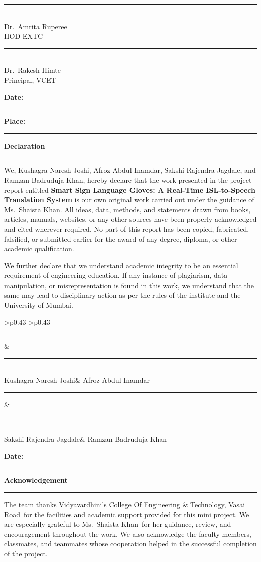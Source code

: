 \documentclass[12pt,a4paper]{report}
\newcommand{\ProjectTitle}{Smart Sign Language Gloves: A Real-Time ISL-to-Speech Translation System}
\newcommand{\CollegeName}{Vidyavardhini's College Of Engineering \& Technology, Vasai Road}
\newcommand{\SupervisorName}{Ms.\ Shaista Khan}
\newcommand{\StudentOne}{Kushagra Naresh Joshi}
\newcommand{\StudentTwo}{Afroz Abdul Inamdar}
\newcommand{\StudentThree}{Sakshi Rajendra Jagdale}
\newcommand{\StudentFour}{Ramzan Badruduja Khan}
\newcommand{\signatureblock}[2]{%
  \begin{minipage}[t]{0.42\textwidth}
    \centering
    \vspace{0.8cm}
    \rule{0.8\textwidth}{0.4pt}\\
    #1\\
    #2
  \end{minipage}
}
\newcommand{\frontmatterheading}[1]{%
  \begin{center}
    {\Large\bfseries #1\par}
    \vspace{0.08in}
    \rule{0.74\textwidth}{0.8pt}
  \end{center}
  \vspace{0.18in}
}
\newcommand{\studentsignaturegrid}{%
  \begingroup
  \begin{center}
    \renewcommand{\arraystretch}{1.35}
    \begin{tabular}{>{\centering\arraybackslash}p{0.43\textwidth} >{\centering\arraybackslash}p{0.43\textwidth}}
      \rule{0.72\linewidth}{0.4pt} & \rule{0.72\linewidth}{0.4pt} \\
      \StudentOne & \StudentTwo \\[1.1cm]
      \rule{0.72\linewidth}{0.4pt} & \rule{0.72\linewidth}{0.4pt} \\
      \StudentThree & \StudentFour \\
    \end{tabular}
  \end{center}
  \endgroup
}
\begin{document}
\vfill
\noindent
\signatureblock{Dr.\ Amrita Ruperee}{HOD EXTC}
\hfill
\signatureblock{Dr.\ Rakesh Himte}{Principal, VCET}

\vspace{0.75cm}
\noindent \textbf{Date:} \rule{1.5in}{0.4pt}\hfill \textbf{Place:} \rule{1.5in}{0.4pt}

\newpage
{}
\thispagestyle{plain}
\frontmatterheading{Declaration}
\begin{center}
  \begin{minipage}{0.9\textwidth}
    \noindent We, \StudentOne, \StudentTwo, \StudentThree, and \StudentFour, hereby declare that the work presented in the project report entitled \textbf{\ProjectTitle} is our own original work carried out under the guidance of \SupervisorName. All ideas, data, methods, and statements drawn from books, articles, manuals, websites, or any other sources have been properly acknowledged and cited wherever required. No part of this report has been copied, fabricated, falsified, or submitted earlier for the award of any degree, diploma, or other academic qualification.

    \vspace{0.18cm}
    \noindent We further declare that we understand academic integrity to be an essential requirement of engineering education. If any instance of plagiarism, data manipulation, or misrepresentation is found in this work, we understand that the same may lead to disciplinary action as per the rules of the institute and the University of Mumbai.
  \end{minipage}
\end{center}

\vspace{0.85cm}
\studentsignaturegrid

\vfill
\noindent \textbf{Date:} \rule{1.5in}{0.4pt}


\newpage
{}
\thispagestyle{plain}
\frontmatterheading{Acknowledgement}

\begin{center}
  \begin{minipage}{0.9\textwidth}
    \noindent The team thanks \CollegeName\ for the facilities and academic support provided for this mini project. We are especially grateful to \SupervisorName\ for her guidance, review, and encouragement throughout the work. We also acknowledge the faculty members, classmates, and teammates whose cooperation helped in the successful completion of the project.
  \end{minipage}
\end{center}
\end{document}
